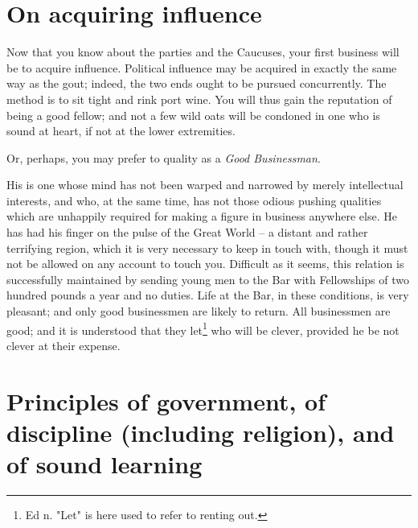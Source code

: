 \documentclass[12pt, oneside, b5paper]{memoir}
\begin{document}
\chapter{On acquiring influence}

Now that you know about the parties and the Caucuses, your first business will be to acquire influence. Political influence may be acquired in exactly the same way as the gout; indeed, the two ends ought to be pursued concurrently. The method is to sit tight and rink port wine. You will thus gain the reputation of being a good fellow; and not a few wild oats will be condoned in one who is sound at heart, if not at the lower extremities.

Or, perhaps, you may prefer to quality as a \textit{Good Businessman}.

His is one whose mind has not been warped and narrowed by merely intellectual interests, and who, at the same time, has not those odious pushing qualities which are unhappily required for making a figure in business anywhere else. He has had his finger on the pulse of the Great World -- a distant and rather terrifying region, which it is very necessary to keep in touch with, though it must not be allowed on any account to touch you. Difficult as it seems, this relation is successfully maintained by sending young men to the Bar with Fellowships of two hundred pounds a year and no duties. Life at the Bar, in these conditions, is very pleasant; and only good businessmen are likely to return. All businessmen are good; and it is understood that they let\footnote{Ed n. "Let" is here used to refer to renting out.} who will be clever, provided he be not clever at their expense.

\chapter{Principles of government, of discipline (including religion), and of sound learning}
\end{document}
